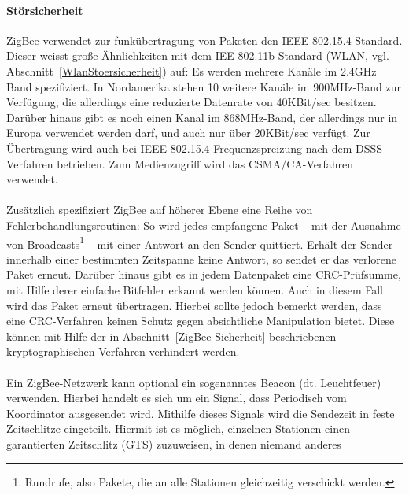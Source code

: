             \paragraph{Störsicherheit}
                ZigBee verwendet zur funkübertragung von Paketen den IEEE 802.15.4 Standard.
                Dieser weisst große Ähnlichkeiten mit dem IEE 802.11b Standard (WLAN, vgl. 
                Abschnitt~\ref{WlanStoersicherheit}) auf: Es werden mehrere Kanäle im
                2.4GHz Band spezifiziert. In Nordamerika stehen 10 weitere Kanäle im 900MHz-Band
                zur Verfügung, die allerdings eine reduzierte Datenrate von 40KBit/sec besitzen. 
                Darüber hinaus gibt es noch einen Kanal im 868MHz-Band, der allerdings nur in Europa
                verwendet werden darf, und auch nur über 20KBit/sec verfügt.  Zur Übertragung wird auch bei 
                IEEE 802.15.4 Frequenzspreizung nach dem DSSS-Verfahren betrieben. Zum Medienzugriff
                wird das CSMA/CA-Verfahren verwendet.\\
                \\
                Zusätzlich spezifiziert ZigBee auf höherer Ebene eine Reihe von Fehlerbehandlungsroutinen:
                So wird jedes empfangene Paket -- mit der Ausnahme von Broadcasts\footnote{Rundrufe, also
                Pakete, die an alle Stationen gleichzeitig verschickt werden.} -- mit einer Antwort
                an den Sender quittiert. Erhält der Sender innerhalb einer bestimmten Zeitspanne
                keine Antwort, so sendet er das verlorene Paket erneut. Darüber hinaus gibt es in jedem
                Datenpaket eine CRC-Prüfsumme, mit Hilfe derer einfache Bitfehler erkannt werden können.
                Auch in diesem Fall wird das Paket erneut übertragen. Hierbei sollte jedoch bemerkt werden,
                dass eine CRC-Verfahren keinen Schutz gegen absichtliche Manipulation bietet. Diese können
                mit Hilfe der in Abschnitt~\ref{ZigBee Sicherheit} beschriebenen kryptographischen Verfahren
                verhindert werden.\\
                \\
                Ein ZigBee-Netzwerk kann optional ein sogenanntes Beacon (dt. Leuchtfeuer) verwenden. Hierbei
                handelt es sich um ein Signal, dass Periodisch vom Koordinator ausgesendet wird. Mithilfe
                dieses Signals wird die Sendezeit in feste Zeitschlitze eingeteilt. Hiermit ist es möglich, 
                einzelnen Stationen einen garantierten Zeitschlitz (GTS) zuzuweisen, in denen niemand anderes
